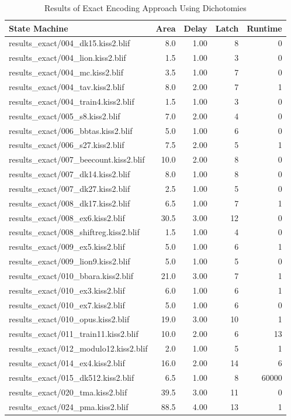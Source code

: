 \begin{table}[h]
\centering
	\begin{tabular}{|l|r|r|r|r|}
	\hline
		\textbf{State Machine} & \textbf{Area} & \textbf{Delay} & \textbf{Latch} & \textbf{Runtime}\\
		\hline
		results\_exact/004\_dk15.kiss2.blif & 8.0 & 1.00 & 8 & 0\\
		results\_exact/004\_lion.kiss2.blif & 1.5 & 1.00 & 3 & 0\\
		results\_exact/004\_mc.kiss2.blif & 3.5 & 1.00 & 7 & 0\\
		results\_exact/004\_tav.kiss2.blif & 8.0 & 2.00 & 7 & 1\\
		results\_exact/004\_train4.kiss2.blif & 1.5 & 1.00 & 3 & 0\\
		results\_exact/005\_s8.kiss2.blif & 7.0 & 2.00 & 4 & 0\\
		results\_exact/006\_bbtas.kiss2.blif & 5.0 & 1.00 & 6 & 0\\
		results\_exact/006\_s27.kiss2.blif & 7.5 & 2.00 & 5 & 1\\
		results\_exact/007\_beecount.kiss2.blif & 10.0 & 2.00 & 8 & 0\\
		results\_exact/007\_dk14.kiss2.blif & 8.0 & 1.00 & 8 & 0\\
		results\_exact/007\_dk27.kiss2.blif & 2.5 & 1.00 & 5 & 0\\
		results\_exact/008\_dk17.kiss2.blif & 6.5 & 1.00 & 7 & 1\\
		results\_exact/008\_ex6.kiss2.blif & 30.5 & 3.00 & 12 & 0\\
		results\_exact/008\_shiftreg.kiss2.blif & 1.5 & 1.00 & 4 & 0\\
		results\_exact/009\_ex5.kiss2.blif & 5.0 & 1.00 & 6 & 1\\
		results\_exact/009\_lion9.kiss2.blif & 5.0 & 1.00 & 5 & 0\\
		results\_exact/010\_bbara.kiss2.blif & 21.0 & 3.00 & 7 & 1\\
		results\_exact/010\_ex3.kiss2.blif & 6.0 & 1.00 & 6 & 1\\
		results\_exact/010\_ex7.kiss2.blif & 5.0 & 1.00 & 6 & 0\\
		results\_exact/010\_opus.kiss2.blif & 19.0 & 3.00 & 10 & 1\\
		results\_exact/011\_train11.kiss2.blif & 10.0 & 2.00 & 6 & 13\\
		results\_exact/012\_modulo12.kiss2.blif & 2.0 & 1.00 & 5 & 1\\
		results\_exact/014\_ex4.kiss2.blif & 16.0 & 2.00 & 14 & 6\\
		results\_exact/015\_dk512.kiss2.blif & 6.5 & 1.00 & 8 & 60000\\
		results\_exact/020\_tma.kiss2.blif & 39.5 & 3.00 & 11 & 0\\
		results\_exact/024\_pma.kiss2.blif & 88.5 & 4.00 & 13 & 1\\
		\hline
	\end{tabular}
	\caption{Results of Exact Encoding Approach Using Dichotomies}
	\label{tab:exact}
\end{table}

